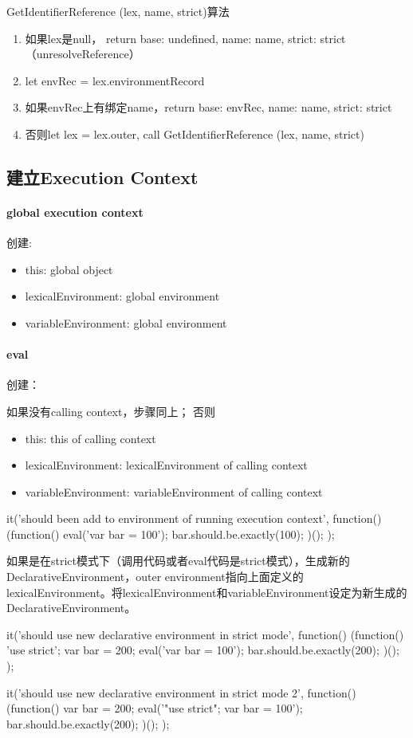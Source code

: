 GetIdentifierReference (lex, name, strict)算法
\begin{enumerate}
\item 如果lex是null， return {base: undefined, name: name, strict: strict}（unresolveReference）
\item let envRec = lex.environmentRecord
\item 如果envRec上有绑定name，return {base: envRec, name: name, strict: strict}
\item 否则let lex = lex.outer, call GetIdentifierReference (lex, name, strict)
\end{enumerate}


\subsection{建立Execution Context}
\paragraph{global execution context}
创建:
\begin{itemize}
\item this: global object
\item lexicalEnvironment: global environment
\item variableEnvironment: global environment
\end{itemize}
\paragraph{eval}
创建：

如果没有calling context，步骤同上；
否则
\begin{itemize}
\item this: this of calling context
\item lexicalEnvironment: lexicalEnvironment of calling context
\item variableEnvironment: variableEnvironment of calling context
\end{itemize}
\begin{JavaScript}
		it('should been add to environment of running execution context', function(){
			(function(){
				eval('var bar = 100');
				bar.should.be.exactly(100);
			})();
		});
\end{JavaScript}
如果是在strict模式下（调用代码或者eval代码是strict模式），生成新的DeclarativeEnvironment，outer environment指向上面定义的lexicalEnvironment。将lexicalEnvironment和variableEnvironment设定为新生成的DeclarativeEnvironment。
\begin{JavaScript}
		it('should use new declarative environment in strict mode', function(){
			(function(){
				'use strict';
				var bar = 200;
				eval('var bar = 100');
				bar.should.be.exactly(200);
			})();
		});

		it('should use new declarative environment in strict mode 2', function(){
			(function(){
				var bar = 200;
				eval('"use strict"; var bar = 100');
				bar.should.be.exactly(200);
			})();
		});
\end{JavaScript}
